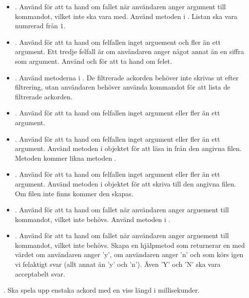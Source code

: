 {\begin{itemize}
\item {}. Använd  för att ta hand om fallet när användaren anger argument till kommandot, vilket inte ska vara med. Använd metoden i . Listan ska vara numrerad från $1$.

\item {}. Använd  för att ta hand om felfallen inget arguement och fler än ett argument. Ett tredje felfall är om användaren anger något annat än en siffra som argument. Använd  och  för att ta hand om felet.

\item {}. Använd metoderna i . De filtrerade ackorden behöver inte skrivas ut efter filtrering, utan användaren behöver använda kommandot  för att lista de filtrerade ackorden.

\item {}. Använd  för att ta hand om felfallen inget argument eller fler än ett argument.

\item {}. Använd  för att ta hand om felfallen inget argument eller fler än ett argument. Använd metoden  i objektet  för att läsa in från den angivna filen. Metoden kommer likna metoden .

\item {}. Använd  för att ta hand om felfallen inget argument eller fler än ett argument. Använd metoden  i objektet  för att skriva till den angivna filen. Om filen inte finns kommer den skapas.

\item {}. Använd  för att ta hand om fallet när användaren anger arguement till kommandot, vilket inte behövs. Använd metoden i .

\item {}. Använd  för att ta hand om fallet när användaren anger arguement till kommandot, vilket inte behövs. Skapa en hjälpmetod  som returnerar en  med värdet  om användaren anger 'y',  om användaren anger 'n' och som körs igen vi felaktigt svar (allt annat än 'y' och 'n'). Även 'Y' och 'N' ska vara acceptabelt svar.
\end{itemize}

\Task {}. Ska spela upp enstaka ackord  med en viss längd  i millisekunder.

}
